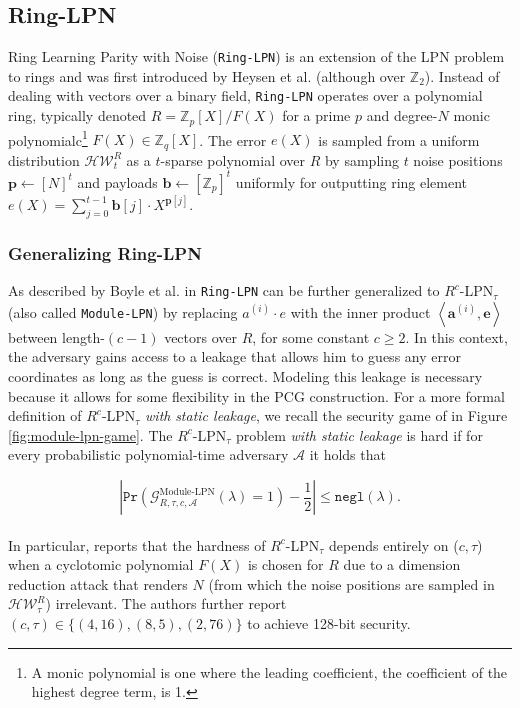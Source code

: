 \subsection{Ring-LPN}
\label{prelim:ring_lpn}
Ring Learning Parity with Noise (\texttt{Ring-LPN}) is an extension of the LPN problem to rings and was first introduced by Heysen et al. \cite{heyse2012lapin} (although over $\mathbb{Z}_2$). Instead of dealing with vectors over a binary field, \texttt{Ring-LPN} operates over a polynomial ring, typically denoted $R =\mathbb{Z}_p[X]/F(X)$ for a prime $p$ and degree-$N$ monic polynomialc\footnote{A monic polynomial is one where the leading coefficient, the coefficient of the highest degree term, is 1.} $F(X)\in \mathbb{Z}_q[X] $. The error $e(X)$ is sampled from a uniform distribution $\mathcal{H W}_{t}^{R}$ as a $t$-sparse polynomial over $R$ by sampling $t$ noise positions $\mathbf{p} \leftarrow [N]^t$ and payloads $\mathbf{b} \leftarrow [\mathbb{Z}_p]^t$ uniformly for outputting ring element $e(X) = \sum_{j=0}^{t-1} \mathbf{b}[j] \cdot X^{\mathbf{p}[j]}$. 

\subsubsection{Generalizing Ring-LPN}
As described by Boyle et al. in \cite{boyle2020efficient} \texttt{Ring-LPN} can be further generalized to $R^{c}$-LPN$_{\tau}$ (also called \texttt{Module-LPN}) by replacing $a^{(i)} \cdot e$ with the inner product $\left\langle\mathbf{a}^{(i)}, \mathbf{e}\right\rangle$ between length-$(c-1)$ vectors over $R$, for some constant $c \geq 2$. In this context, the adversary gains access to a leakage that allows him to guess any error coordinates as long as the guess is correct. Modeling this leakage is necessary because it allows for some flexibility in the PCG construction. For a more formal definition of $R^{c}$-LPN$_{\tau}$ \textit{with} \textit{static leakage}, we recall the security game of \cite{abram2022low} in Figure \ref{fig:module-lpn-game}. The $R^{c}$-LPN$_{\tau}$ problem \textit{with static leakage} is hard if for every probabilistic polynomial-time adversary $\mathcal{A}$ it holds that

$$
\left|\texttt{Pr}\left(\mathcal{G}_{R, \tau, c,\mathcal{A}}^{\text{Module-LPN}}(\lambda) = 1\right) - \frac{1}{2}\right|\leq \texttt{negl}(\lambda) .
$$
\\
In particular, \cite{boyle2020efficient} reports that the hardness of $R^{c}$-LPN$_{\tau}$ depends entirely on ($c,\tau$) when a cyclotomic polynomial $F(X)$ is chosen for $R$ due to a dimension reduction attack that renders $N$ (from which the noise positions are sampled in $\mathcal{H W}_{\tau}^{R}$) irrelevant. The authors further report $(c,\tau) \in \{(4,16),(8,5),(2,76)\}$ to achieve 128-bit security.

